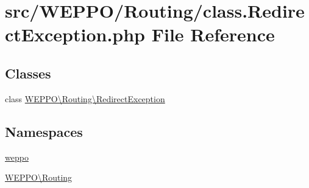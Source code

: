 \hypertarget{class_8RedirectException_8php}{}\section{src/\+W\+E\+P\+P\+O/\+Routing/class.Redirect\+Exception.\+php File Reference}
\label{class_8RedirectException_8php}
\subsection*{Classes}
\begin{DoxyCompactItemize}
\item 
class \hyperlink{classWEPPO_1_1Routing_1_1RedirectException}{W\+E\+P\+P\+O\textbackslash{}\+Routing\textbackslash{}\+Redirect\+Exception}
\end{DoxyCompactItemize}
\subsection*{Namespaces}
\begin{DoxyCompactItemize}
\item 
 \hyperlink{namespaceweppo}{weppo}
\item 
 \hyperlink{namespaceWEPPO_1_1Routing}{W\+E\+P\+P\+O\textbackslash{}\+Routing}
\end{DoxyCompactItemize}
